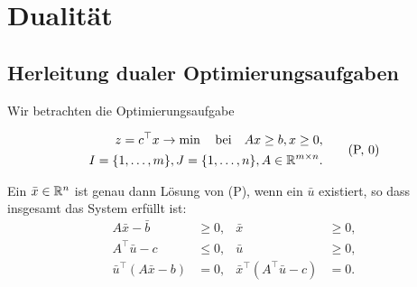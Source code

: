 \section{Dualität}
\subsection{Herleitung dualer Optimierungsaufgaben}
Wir betrachten die Optimierungsaufgabe
\addtocounter{equation}{3}
\begin{equation} %
  \begin{aligned} z = c^\top x \to \min \subjto Ax \ge b, x \ge 0, \\
    I =\{ 1, \ldots, m \}, J = \{1, \ldots, n \}, A \in \realmat{m}{n}.
  \end{aligned}
  \tag{P, \theequation}
\end{equation}

\begin{thm}[Charakterisierungssatz]
  Ein $\bar{x} \in \mathbb{R}^n$ ist genau dann Lösung von (P), wenn ein $\bar{u}$
  existiert, so dass insgesamt das System erfüllt ist:
  \begin{align*}
    A \bar{x} - \bar{b} &\ge 0, & \bar{x} &\ge 0, \tag{1} \\
    A^\top \bar{u} - c &\le 0, & \bar{u} &\ge 0, \tag{2} \\
    \bar{u}^\top (A \bar{x} - b) &= 0, & \bar{x}^\top (A^\top \bar{u} - c) &= 0. \tag{3}
  \end{align*}
\end{thm}

